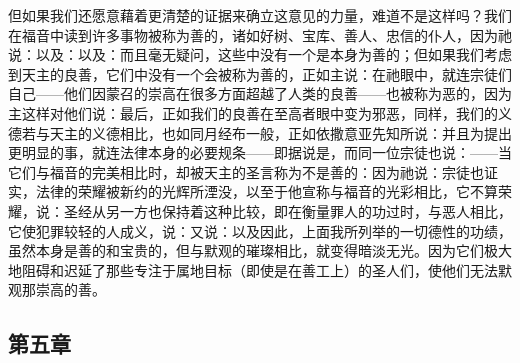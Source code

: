 但如果我们还愿意藉着更清楚的证据来确立这意见的力量，难道不是这样吗？我们在福音中读到许多事物被称为善的，诸如好树、宝库、善人、忠信的仆人，因为祂说：以及：以及：而且毫无疑问，这些中没有一个是本身为善的；但如果我们考虑到天主的良善，它们中没有一个会被称为善的，正如主说：在祂眼中，就连宗徒们自己——他们因蒙召的崇高在很多方面超越了人类的良善——也被称为恶的，因为主这样对他们说：最后，正如我们的良善在至高者眼中变为邪恶，同样，我们的义德若与天主的义德相比，也如同月经布一般，正如依撒意亚先知所说：并且为提出更明显的事，就连法律本身的必要规条——即据说是，而同一位宗徒也说：——当它们与福音的完美相比时，却被天主的圣言称为不是善的：因为祂说：宗徒也证实，法律的荣耀被新约的光辉所湮没，以至于他宣称与福音的光彩相比，它不算荣耀，说：圣经从另一方也保持着这种比较，即在衡量罪人的功过时，与恶人相比，它使犯罪较轻的人成义，说：又说：以及因此，上面我所列举的一切德性的功绩，虽然本身是善的和宝贵的，但与默观的璀璨相比，就变得暗淡无光。因为它们极大地阻碍和迟延了那些专注于属地目标（即使是在善工上）的圣人们，使他们无法默观那崇高的善。\par


\subsection{第五章}

\par

